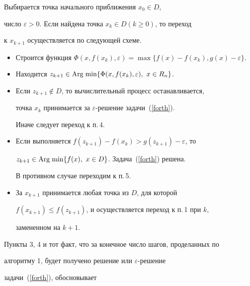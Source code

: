 \begin{alg}


Выбирается точка начального приближения $x_0\in D$,


число $\varepsilon>0$. Если найдена точка $x_k\in D (k\ge0)$, то переход


к $x_{k+1}$ осуществляется по следующей схеме.


\begin{itemize}


\item[1.] Строится функция $\Phi(x,f(x_k),\varepsilon)=\max\{f(x)-f(x_k),


g(x)-\varepsilon\}$.


\item[2.] Находится $z_{k+1}\in


\Argmin\{\Phi(x,f(x_k),\varepsilon),\ x\in R_n\}$.


\item[3.] Если $z_{k+1}\notin D$, то вычислительный процесс останавливается,


точка $x_k$ принимается за $\varepsilon$-решение задачи~(\ref{forth}).


Иначе следует переход к п.\,4.


\item[4.] Если выполняется $f(z_{k+1})-f(x_k)>g(z_{k+1})-\varepsilon$, то


$z_{k+1}\in\operatorname{Arg\;min}\{f(x),\ x\in D\}$. Задача~(\ref{forth}) решена.


В противном случае переходим к п.\,5.


\item[5.] За $x_{k+1}$ принимается любая точка из $D$, для которой


$f(x_{k+1})\le f(z_{k+1})$, и осуществляется переход к п.\,1 при $k$,


замененном на $k+1$.


\end{itemize}


\end{alg}





Пункты 3, 4 и тот факт, что за конечное число шагов, проделанных по


алгоритму 1, будет получено решение или $\varepsilon$-решение


задачи~(\ref{forth}), обосновывает





